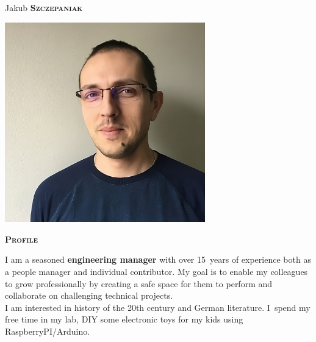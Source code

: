 \documentclass[11pt, a4paper]{article}
\newcommand{\headleft}[1]{\vspace*{3ex}\textsc{\textbf{#1}}\par%
    \vspace*{-1.5ex}\hrulefill\par\vspace*{0.7ex}}
\begin{document}
\setlength{\topskip}{0pt}
\setlength{\parindent}{0pt}
\setlength{\parskip}{0pt}
\setlength{\fboxsep}{0pt}
\pagestyle{empty}
\raggedbottom

\begin{minipage}[t]{0.33\textwidth} %
\colorbox{cvblue}{\begin{minipage}[t][5mm][t]{\textwidth}\null\hfill\null\end{minipage}}

\vspace{-.2ex} %
\colorbox{cvblue!90}{\color{white}  %
\textwidth\relax%
\begin{minipage}[t][293mm][t]{0.82\textwidth}
\raggedright
\vspace*{2.5ex}

\Large Jakub \textbf{\textsc{Szczepaniak}} \normalsize 

\null\hfill\includegraphics[width=0.65\textwidth]{photo.jpg}\hfill\null

\vspace*{0.5ex} %

\headleft{Profile}
I am a seasoned \textbf{engineering manager} with over 15~years of experience both as a people manager and individual contributor.
My goal is to enable my colleagues to grow professionally by creating a safe space for them to perform and collaborate on challenging technical projects.\\
I am interested in history of the 20th century and German literature.
I~spend my free time in my lab, DIY some electronic toys for my kids using RaspberryPI/Arduino.


\end{minipage}}
\end{minipage}
\end{document}

